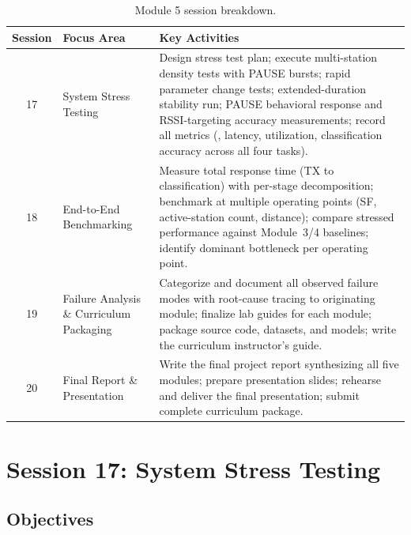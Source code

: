 \documentclass[11pt,letterpaper]{article}
\begin{document}
	\begin{table}[ht!]
		\centering
		\caption{Module 5 session breakdown.}
		\label{tab:schedule}
		\renewcommand{\arraystretch}{1.4}
		\begin{tabularx}{\textwidth}{c l X}
			\toprule
			\textbf{Session} & \textbf{Focus Area} & \textbf{Key Activities} \\
			\midrule
			17 & System Stress Testing &
			Design stress test plan; execute multi-station density tests with PAUSE bursts; rapid parameter change tests; extended-duration stability run; PAUSE behavioral response and RSSI-targeting accuracy measurements; record all metrics (\PER{}, latency, \FIFO{} utilization, classification accuracy across all four tasks). \\
			18 & End-to-End Benchmarking &
			Measure total response time (TX to classification) with per-stage decomposition; benchmark at multiple operating points (SF, active-station count, distance); compare stressed performance against Module~3/4 baselines; identify dominant bottleneck per operating point. \\
			19 & Failure Analysis \& Curriculum Packaging &
			Categorize and document all observed failure modes with root-cause tracing to originating module; finalize lab guides for each module; package source code, datasets, and models; write the curriculum instructor's guide. \\
			20 & Final Report \& Presentation &
			Write the final project report synthesizing all five modules; prepare presentation slides; rehearse and deliver the final presentation; submit complete curriculum package. \\
			\bottomrule
		\end{tabularx}
	\end{table}

	\newpage
	\section{Session 17: System Stress Testing}
	\label{sec:stress}

	\subsection{Objectives}
\end{document}
